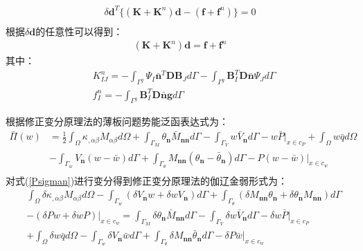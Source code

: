 \begin{equation}
\begin{split}
   \delta\pmb{d}^T\{(\pmb{K}+\pmb{K}^n)\pmb{d}-(\pmb{f}+\pmb{f}^n)\}=0\\
\end{split}
\end{equation}
根据$\delta\pmb{d}$的任意性可以得到：
\begin{equation}
\begin{split}
    (\pmb{K}+\pmb{K}^n)\pmb{d}=\pmb{f}+\pmb{f}^n
\end{split}
\end{equation}
其中：
\begin{equation}
\begin{split}
&K^n_{IJ}=-\int_{\Gamma^g}\Psi_I\bar{\pmb{n}}^T\pmb{D}\pmb{B}_Jd\Gamma-\int_{\Gamma^g}\pmb{B}_I^T\pmb{D}\bar{\pmb{n}}\Psi_Jd\Gamma\\
&f^n_I=-\int_{\Gamma^g}\pmb{B}_I^T\pmb{D}\bar{\pmb{n}}\pmb{g}d\Gamma
\end{split}
\end{equation}\par
根据\cite{}修正变分原理法的薄板问题势能泛函表达式为：
\begin{equation}\label{Psigman}
\begin{split}
    \bar{\Pi}(w)&=\frac{1}{2}\int_{\Omega}\kappa_{,\alpha\beta}M_{\alpha\beta}d\Omega+\int_{\Gamma_M}\theta_{\pmb{n}}\bar{M}_{\pmb{nn}}d\Gamma-\int_{\Gamma_V}w\bar{V}_{\pmb{n}}d\Gamma-w\bar{P}\vert_{x\in c_P}+\int_{\Omega}w\bar{q}d\Omega\\
    &-\int_{\Gamma_w}V_{\pmb{n}}(w-\bar{w})d\Gamma+\int_{\Gamma_{\theta}}M_{\pmb{nn}}(\theta_{\pmb{n}}-\bar{\theta}_{\pmb{n}})d\Gamma-P(w-\bar{w})\vert_{x\in c_w}\\
\end{split}
\end{equation}
对式(\ref{Psigman})进行变分得到修正变分原理法的伽辽金弱形式为：
\begin{equation}
    \begin{split}
    &\int_{\Omega}\delta\kappa_{,\alpha\beta}M_{\alpha\beta}d\Omega-\int_{\Gamma_w}(\delta V_{\pmb{n}}w+\delta wV_{\pmb{n}})d\Gamma+\int_{\Gamma_{\theta}}(\delta M_{\pmb{nn}}\theta_{\pmb{n}}+\delta\theta_{\pmb{n}}M_{\pmb{nn}})d\Gamma\\
    &-(\delta Pw+\delta wP)\vert_{x\in c_w}
    =\int_{\Gamma_M}\delta\theta_{\pmb{n}}\bar{M}_{\pmb{nn}}d\Gamma-\int_{\Gamma_V}\delta w\bar{V}_{\pmb{n}}d\Gamma-\delta w\bar{P}\vert_{x\in c_P}\\
    &+\int_{\Omega}\delta w\bar{q}d\Omega
    -\int_{\Gamma_w}\delta V_{\pmb{n}}\bar{w}d\Gamma+\int_{\Gamma_{\theta}}\delta M_{\pmb{nn}}\bar{\theta}_{\pmb{n}}d\Gamma-\delta P\bar{w}\vert_{x\in c_w}
\end{split}
\end{equation}\par
